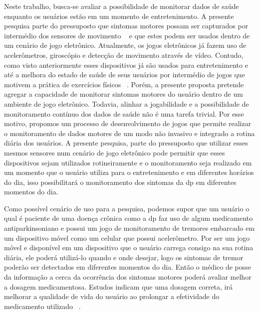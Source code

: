  Neste trabalho, busca-se avaliar a possibilidade de monitorar dados de saúde enquanto os usuários estão em um momento de entretenimento. A presente pesquisa parte do pressuposto que sintomas motores possam ser capturados por intermédio dos sensores de movimento ~\cite{visionbased2009,patel_monitoring_2009,bachlin_parkinsons_2009} e que estes podem ser usados dentro de um cenário de jogo eletrônico. Atualmente, os jogos eletrônicos já fazem uso de acelerômetros, giroscópio e detecção de movimento através de vídeo.  Contudo, como visto anteriormente esses dispositivos já são usados para entretenimento e até a melhora do estado de saúde de seus usuários por intermédio de jogos que motivem a prática de exercícios físicos ~\cite{Suhonen:2008:SFE:1457199.1457204,vaghetti2011,bartolome11}. Porém, a presente proposta pretende agregar a capacidade de monitorar sintomas motores do usuário dentro de um ambiente de jogo eletrônico. Todavia, alinhar a jogabilidade e a possibilidade de monitoramento contínuo dos dados de saúde não é uma tarefa trivial. Por esse motivo, propomos um processo de desenvolvimento de jogos que permite realizar o monitoramento de dados motores de um modo não invasivo e integrado a rotina diária dos usuários. A presente pesquisa, parte do pressuposto que utilizar esses mesmos sensores num cenário de jogo eletrônico pode permitir que esses dispositivos sejam utilizados rotineiramente e o monitoramento seja realizado em um momento que o usuário utiliza para o entretenimento e em diferentes horários do dia, isso possibilitará o monitoramento dos sintomas da \ac{dp} em diferentes momentos do dia. 

Como possível cenário de uso para a pesquisa, podemos supor que um usuário o qual é paciente de uma doença crônica como a \ac{dp} faz uso de algum medicamento antiparkinsoniano e possui um jogo de monitoramento de tremores embarcado em um dispositivo móvel como um celular que possui acelerômetro. Por ser um jogo móvel e disponível em um dispositivo que o usuário carrega consigo na sua rotina diária, ele poderá utilizá-lo quando e onde desejar, logo os sintomas de tremor poderão ser detectados em diferentes momentos do dia. Então o médico de posse da informação a cerca da ocorrência dos sintomas motores poderá avaliar melhor a dosagem medicamentosa. Estudos indicam que uma dosagem correta, irá melhorar a qualidade de vida do usuário ao prolongar a efetividade do medicamento utilizado ~\cite{rodrigues2006}.
